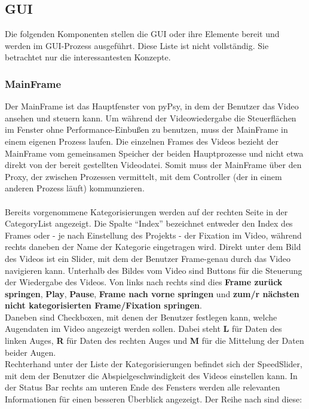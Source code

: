 \documentclass[a4paper,draft]{scrartcl}
\begin{document}
\subsection{GUI}
Die folgenden Komponenten stellen die GUI oder ihre Elemente bereit und werden im GUI-Prozess ausgef\"uhrt.
Diese Liste ist nicht vollst\"andig.
Sie betrachtet nur die interessantesten Konzepte.

\subsubsection{MainFrame}
Der MainFrame ist das Hauptfenster von pyPsy, in dem der Benutzer das Video ansehen und steuern kann. Um während der Videowiedergabe die Steuerflächen im Fenster ohne Performance-Einbußen zu benutzen, muss der MainFrame in einem eigenen Prozess laufen. Die einzelnen Frames des Videos bezieht der MainFrame vom gemeinsamen Speicher der beiden Hauptprozesse und nicht etwa direkt von der bereit gestellten Videodatei. Somit muss der MainFrame über den Proxy, der zwischen Prozessen vermittelt, mit dem Controller (der in einem anderen Prozess läuft) kommunzieren. \\  \\
Bereits vorgenommene Kategorisierungen werden auf der rechten Seite in der CategoryList angezeigt. Die Spalte "`Index"' bezeichnet entweder den Index des Frames oder - je nach Einstellung des Projekts - der Fixation im Video, während rechts daneben der Name der Kategorie eingetragen wird. 
Direkt unter dem Bild des Videos ist ein Slider, mit dem der Benutzer Frame-genau durch das Video navigieren kann.
Unterhalb des Bildes vom Video sind Buttons für die Steuerung der Wiedergabe des Videos. Von links nach rechts sind dies \textbf{Frame zurück springen}, \textbf{Play}, \textbf{Pause}, \textbf{Frame nach vorne springen} und \textbf{zum/r nächsten nicht kategorisierten Frame/Fixation springen}. \\
Daneben sind Checkboxen, mit denen der Benutzer festlegen kann, welche Augendaten im Video angezeigt werden sollen. Dabei steht \textbf{L} für Daten des linken Auges, \textbf{R} für Daten des rechten Auges und \textbf{M} für die Mittelung der Daten beider Augen. \\
Rechterhand unter der Liste der Kategorisierungen befindet sich der SpeedSlider, mit dem der Benutzer die Abspielgeschwindigkeit des Videos einstellen kann. 
In der Status Bar rechts am unteren Ende des Fensters werden alle relevanten Informationen für einen besseren Überblick angezeigt. Der Reihe nach sind diese:
\end{document}

